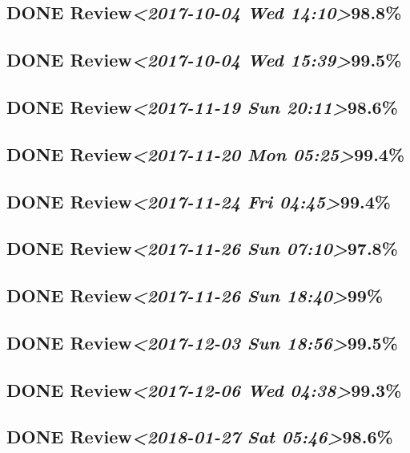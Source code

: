 \documentclass[11pt]{ctexart}
\begin{document}
\subsection{{\bfseries\sffamily DONE} Review\textit{<2017-10-04 Wed 14:10>}98.8\%}
\label{sec:org3c578c1}
\subsection{{\bfseries\sffamily DONE} Review\textit{<2017-10-04 Wed 15:39>}99.5\%}
\label{sec:org8a04280}

\subsection{{\bfseries\sffamily DONE} Review\textit{<2017-11-19 Sun 20:11>}98.6\%}
\label{sec:orgf7c2c29}
\subsection{{\bfseries\sffamily DONE} Review\textit{<2017-11-20 Mon 05:25>}99.4\%}
\label{sec:org9ed94d0}
\subsection{{\bfseries\sffamily DONE} Review\textit{<2017-11-24 Fri 04:45>}99.4\%}
\label{sec:org4c6f02e}
\subsection{{\bfseries\sffamily DONE} Review\textit{<2017-11-26 Sun 07:10>}97.8\%}
\label{sec:org92f7c28}
\subsection{{\bfseries\sffamily DONE} Review\textit{<2017-11-26 Sun 18:40>}99\%}
\label{sec:orgbdc54a3}
\subsection{{\bfseries\sffamily DONE} Review\textit{<2017-12-03 Sun 18:56>}99.5\%}
\label{sec:org17b192d}
\subsection{{\bfseries\sffamily DONE} Review\textit{<2017-12-06 Wed 04:38>}99.3\%}
\label{sec:orgd2cc116}
\subsection{{\bfseries\sffamily DONE} Review\textit{<2018-01-27 Sat 05:46>}98.6\%}
\label{sec:orgbd736ba}
\end{document}
